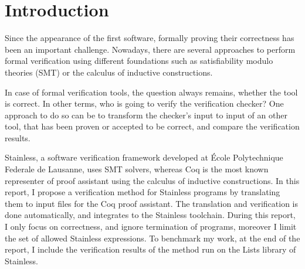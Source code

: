 \section{Introduction}
\label{sec:introduction}

Since the appearance of the first software, formally proving their correctness has been an important challenge. Nowadays, there are several approaches to perform formal verification using different foundations such as satisfiability modulo theories (SMT) or the calculus of inductive constructions.

In case of formal verification tools, the question always remains, whether the tool is correct. In other terms, who is going to verify the verification checker? One approach to do so can be to transform the checker's input to input of an other tool, that has been proven or accepted to be correct, and compare the verification results. 


Stainless, a software verification framework developed at École Polytechnique Federale de Lausanne, uses SMT solvers, whereas Coq is the most known representer of proof assistant using the calculus of inductive constructions. In this report, I propose a verification method for Stainless programs by translating them to input files for the Coq proof assistant. The translation and verification is done automatically, and integrates to the Stainless toolchain. During this report, I only focus on correctness, and ignore termination of programs, moreover I limit the set of allowed Stainless expressions. To benchmark my work, at the end of the report, I include the verification results of the method run on the Lists library of Stainless.